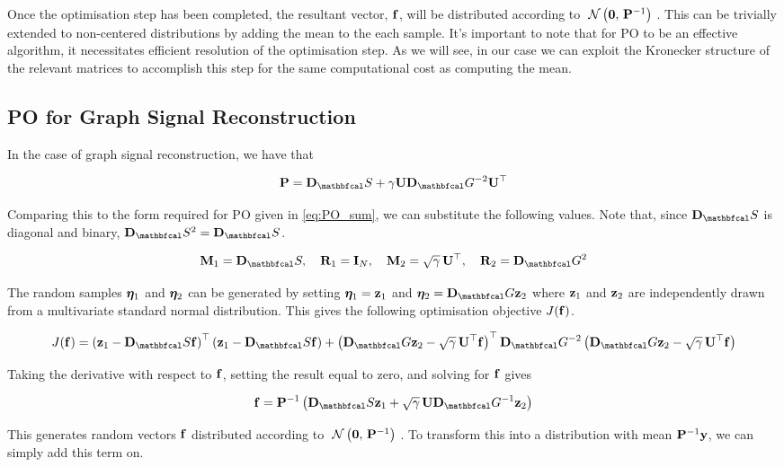 Once the optimisation step has been completed, the resultant vector, $\mathbf{f}$, will be distributed according to $\; \mathcal{N}\left(\mathbf{0}, \, \mathbf{P}^{-1}\right) \;$. This can be trivially extended to non-centered distributions by adding the mean to the each sample. It's important to note that for PO to be an effective algorithm, it necessitates efficient resolution of the optimisation step. As we will see, in our case we can exploit the Kronecker structure of the relevant matrices to accomplish this step for the same computational cost as computing the mean.  

\subsection{PO for Graph Signal Reconstruction}

\label{sec:GSR_PO}


In the case of graph signal reconstruction, we have that 

$$
\PP = \D_\St + \gamma \U \D_\Gt^{-2} \U^\top
$$

Comparing this to the form required for PO given in \cref{eq:PO_sum}, we can substitute the following values. Note that, since $\D_\St$ is diagonal and binary, $\D_\St^2 = \D_\St$. 

$$
\M_1 = \D_\St, \quad  \RR_1 = \I_N, \quad \M_2 = \sqrt{\gamma} \, \U^\top, \quad  \RR_2 = \D_\Gt^2
$$

The random samples $\boldsymbol{\eta}_1$ and $\boldsymbol{\eta}_2$ can be generated by setting $\boldsymbol{\eta}_1 = \mathbf{z}_1$ and $\etaa_2 = \D_\Gt \z_2$ where $\mathbf{z}_1$ and $\mathbf{z}_2$ are independently drawn from a multivariate standard normal distribution. This gives the following optimisation objective $J(\mathbf{f})$.

\begin{equation}
    J(\f) = \left(\z_1 - \D_\St \f\right)^\top\left(\z_1 - \D_\St \f\right) + \left(\D_\Gt \z_2 - \sqrt{\gamma} \, \U^\top  \f\right)^\top \D_\Gt^{-2} \left(\D_\Gt \z_2 - \sqrt{\gamma} \, \U^\top  \f\right)
\end{equation}

Taking the derivative with respect to $\mathbf{f}$, setting the result equal to zero, and solving for $\mathbf{f}$ gives

\begin{equation}
    \f = \PP^{-1} \left(\D_\St \z_1 + \sqrt{\gamma} \, \U \D_\Gt^{-1} \z_2 \right)
\end{equation}

This generates random vectors $\mathbf{f}$ distributed according to $\; \mathcal{N}\left(\mathbf{0}, \, \mathbf{P}^{-1}\right) \;$. To transform this into a distribution with mean $\mathbf{P}^{-1} \mathbf{y}$, we can simply add this term on. 

